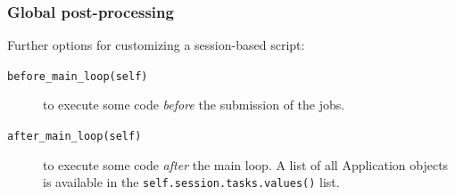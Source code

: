 \documentclass[english,serif,mathserif,xcolor=pdftex,dvipsnames,table]{beamer}
\begin{document}
\begin{frame}
  \frametitle{Global post-processing}
Further options for customizing a session-based script:
\begin{description}
\item [\texttt{before\_main\_loop(self)}] to execute some code
  \emph{before} the submission of the jobs.
\item [\texttt{after\_main\_loop(self)}] to execute some code
  \emph{after} the main loop. A list of all Application objects is
  available in the \lstinline|self.session.tasks.values()| list.
\end{description}
\end{frame}
\end{document}

